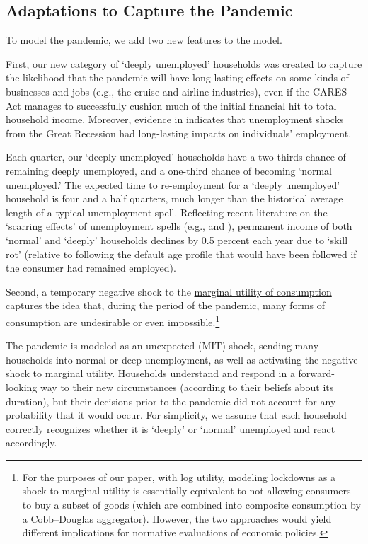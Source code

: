 \documentclass[titlepage,a4paper]{\econtex}
\begin{document}
\subsection{Adaptations to Capture the Pandemic}

To model the pandemic, we add two new features to the model.

First, our new category of `deeply unemployed' households was created to capture the likelihood that the pandemic will have long-lasting effects on some kinds of businesses and jobs (e.g., the cruise and airline industries), even if the CARES Act manages to successfully cushion much of the initial financial hit to total household income.  Moreover, evidence in \cite{yagan_hysteresis} indicates that unemployment shocks from the Great Recession had long-lasting impacts on individuals' employment.

Each quarter, our `deeply unemployed' households have a two-thirds chance of remaining deeply unemployed, and a one-third chance of becoming `normal unemployed.'
The expected time to re-employment for a `deeply unemployed' household is four and a half quarters, much longer than the historical average length of a typical unemployment spell.
Reflecting recent literature on the `scarring effects' of unemployment spells (e.g., \cite{wachter_scarring} and \cite{hpv:cycleTrend}), permanent income of both `normal' and `deeply' households declines by 0.5 percent each year due to `skill rot' (relative to following the default age profile that would have been followed if the consumer had remained employed).

Second, a temporary negative shock to the \href{https://www.investopedia.com/terms/m/marginalutility.asp}{marginal utility of consumption} captures the idea that, during the period of the pandemic, many forms of consumption are undesirable or even impossible.\footnote{For the purposes of our paper, with log utility, modeling lockdowns as a shock to marginal utility is essentially equivalent to not allowing consumers to buy a subset of goods (which are combined into composite consumption by a Cobb--Douglas aggregator). However, the two approaches would yield different implications for normative evaluations of economic policies.}

The pandemic is modeled as an unexpected (MIT) shock, sending many households into normal or deep unemployment, as well as activating the negative shock to marginal utility. Households understand and respond in a forward-looking way to their new circumstances (according to their beliefs about its duration), but their decisions prior to the pandemic did not account for any probability that it would occur.  For simplicity, we assume that each household correctly recognizes whether it is `deeply' or `normal' unemployed and react accordingly.
\end{document}
